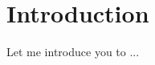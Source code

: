\documentclass[../main.tex]{subfiles}
\begin{document}
\section{Introduction}
Let me introduce you to ...
\end{document}
